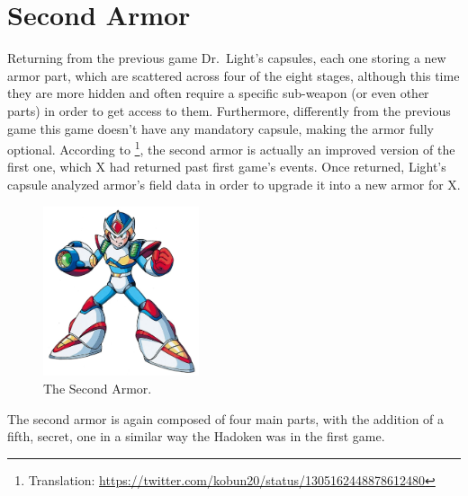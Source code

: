 \section{Second Armor}\label{X2:Armor}
Returning from the previous game Dr.~Light's capsules, each one storing a new armor part, which are scattered across four of the eight stages, although this time they are more hidden and often require a specific sub-weapon (or even other parts) in order to get access to them. Furthermore, differently from the previous game this game doesn't have any mandatory capsule, making the armor fully optional.
According to \cite{tw:second_armor}\footnote{Translation: \url{https://twitter.com/kobun20/status/1305162448878612480}}, the second armor is actually an improved version of the first one, which X had returned past first game's events. Once returned, Light's capsule analyzed armor's field data in order to upgrade it into a new armor for X.

\begin{figure}[htp]
	\centering
	\includegraphics[height=5cm]{figures/X2/X2armor.png}
	\caption{The Second Armor.}
\end{figure}

The second armor is again composed of four main parts, with the addition of a fifth, secret, one in a similar way the Hadoken was in the first game.

